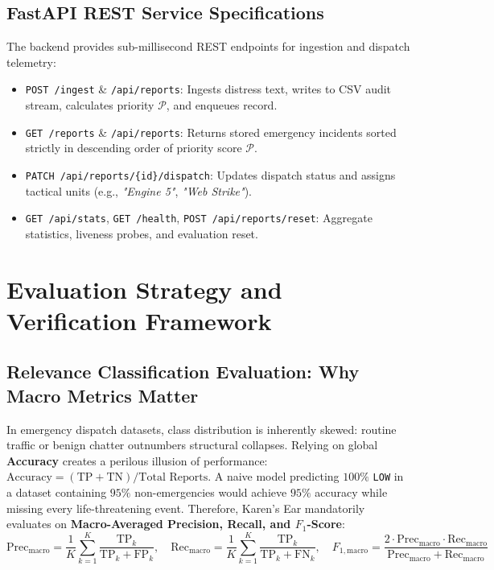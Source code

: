 \documentclass[10pt,a4paper]{article}
\begin{document}
\subsection{FastAPI REST Service Specifications}
The backend provides sub-millisecond REST endpoints for ingestion and dispatch telemetry:
\begin{itemize}
  \item \texttt{POST /ingest} \& \texttt{/api/reports}: Ingests distress text, writes to CSV audit stream, calculates priority $\mathcal{P}$, and enqueues record.
  \item \texttt{GET /reports} \& \texttt{/api/reports}: Returns stored emergency incidents sorted strictly in descending order of priority score $\mathcal{P}$.
  \item \texttt{PATCH /api/reports/\{id\}/dispatch}: Updates dispatch status and assigns tactical units (e.g., \emph{"Engine 5"}, \emph{"Web Strike"}).
  \item \texttt{GET /api/stats}, \texttt{GET /health}, \texttt{POST /api/reports/reset}: Aggregate statistics, liveness probes, and evaluation reset.
\end{itemize}

\section{Evaluation Strategy and Verification Framework}
\subsection{Relevance Classification Evaluation: Why Macro Metrics Matter}
In emergency dispatch datasets, class distribution is inherently skewed: routine traffic or benign chatter outnumbers structural collapses. Relying on global \textbf{Accuracy} creates a perilous illusion of performance: $\text{Accuracy} = (\text{TP} + \text{TN}) / \text{Total Reports}$.
A naive model predicting $100\%$ \texttt{LOW} in a dataset containing $95\%$ non-emergencies would achieve $95\%$ accuracy while missing every life-threatening event. Therefore, Karen's Ear mandatorily evaluates on \textbf{Macro-Averaged Precision, Recall, and $F_1$-Score}:
\begin{equation}
  \text{Prec}_{\text{macro}} = \frac{1}{K}\sum_{k=1}^K \frac{\text{TP}_k}{\text{TP}_k + \text{FP}_k}, \quad
  \text{Rec}_{\text{macro}} = \frac{1}{K}\sum_{k=1}^K \frac{\text{TP}_k}{\text{TP}_k + \text{FN}_k}, \quad
  F_{1,\text{macro}} = \frac{2 \cdot \text{Prec}_{\text{macro}} \cdot \text{Rec}_{\text{macro}}}{\text{Prec}_{\text{macro}} + \text{Rec}_{\text{macro}}}
\end{equation}
\end{document}
